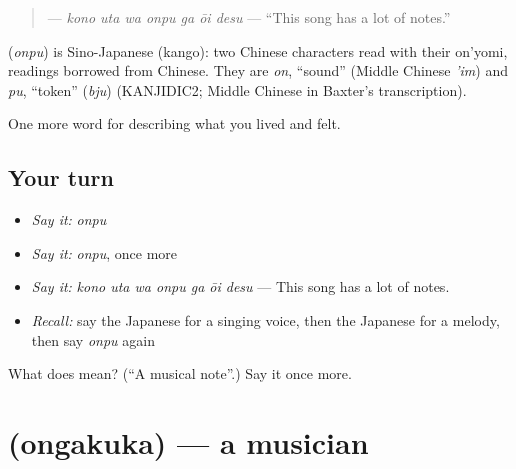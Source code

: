 \begin{quote}
\textbf{   } — \emph{kono uta wa onpu ga ōi desu} — \textquotedblleft{}This song has a lot of notes.\textquotedblright{}
\end{quote}

\begin{cousinweb}
\textbf{} (\emph{onpu}) is Sino-Japanese (kango): two Chinese characters read with their on'yomi, readings borrowed from Chinese. They are \emph{on}, \textquotedblleft{}sound\textquotedblright{} (Middle Chinese \emph{'im}) and \emph{pu}, \textquotedblleft{}token\textquotedblright{} (\emph{bju}) (KANJIDIC2; Middle Chinese in Baxter's transcription).
\end{cousinweb}

\begin{grammarlens}[title={What you've built}]
One more word for describing what you lived and felt.
\end{grammarlens}

\subsection*{Your turn}
\begin{itemize}
\raggedright
  \item \emph{Say it:} \emph{onpu}
  \item \emph{Say it:} \emph{onpu}, once more
  \item \emph{Say it:} \emph{kono uta wa onpu ga ōi desu} — This song has a lot of notes.
  \item \emph{Recall:} say the Japanese for a singing voice, then the Japanese for a melody, then say \emph{onpu} again
\end{itemize}

\begin{tcolorbox}[breakable,colback=teal!4,colframe=teal!35!black,title={Before you move on}]
What does  mean? (\textquotedblleft{}A musical note\textquotedblright{}.) Say it once more.
\end{tcolorbox}
\section[\texorpdfstring{\ja{おんがくか} (ongakuka)}{おんがくか (ongakuka)}]{ (ongakuka) — a musician}

\label{lesson:JA-C503-ongakuka}



